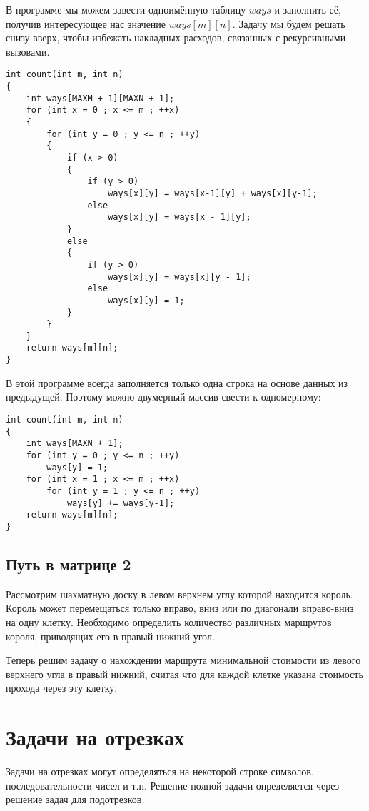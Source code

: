 \documentclass[14pt,openany]{book}
\begin{document}
В программе мы можем завести одноимённую таблицу $ways$ и заполнить её, получив интересующее
нас значение $ways[m][n]$. Задачу мы будем решать снизу вверх, чтобы избежать накладных
расходов, связанных с рекурсивными вызовами.

\begin{lstlisting}
int count(int m, int n)
{
    int ways[MAXM + 1][MAXN + 1];
    for (int x = 0 ; x <= m ; ++x)
    {
        for (int y = 0 ; y <= n ; ++y)
        {
            if (x > 0)
            {
                if (y > 0)
                    ways[x][y] = ways[x-1][y] + ways[x][y-1];
                else
                    ways[x][y] = ways[x - 1][y];
            }
            else
            {
                if (y > 0)
                    ways[x][y] = ways[x][y - 1];
                else
                    ways[x][y] = 1;
            }
        }
    }
    return ways[m][n];
}
\end{lstlisting}

В этой программе всегда заполняется только одна строка на основе данных из предыдущей.
Поэтому можно двумерный массив свести к одномерному:

\begin{lstlisting}
int count(int m, int n)
{
    int ways[MAXN + 1];
    for (int y = 0 ; y <= n ; ++y)
        ways[y] = 1;
    for (int x = 1 ; x <= m ; ++x)
        for (int y = 1 ; y <= n ; ++y)
       	    ways[y] += ways[y-1];
    return ways[m][n];
}
\end{lstlisting}

\section{Путь в матрице 2}

Рассмотрим шахматную доску в левом верхнем углу которой находится король. Король может перемещаться только вправо, вниз или по диагонали вправо-вниз на одну клетку. Необходимо определить количество различных маршрутов короля, приводящих его в правый нижний угол.

Теперь решим задачу о нахождении маршрута минимальной стоимости из левого верхнего угла в правый нижний, считая что для каждой клетке указана стоимость прохода через эту клетку.

\chapter{Задачи на отрезках}

Задачи на отрезках могут определяться на некоторой строке символов, последовательности чисел
и т.п. Решение полной задачи определяется через решение задач для подотрезков.
\end{document}
